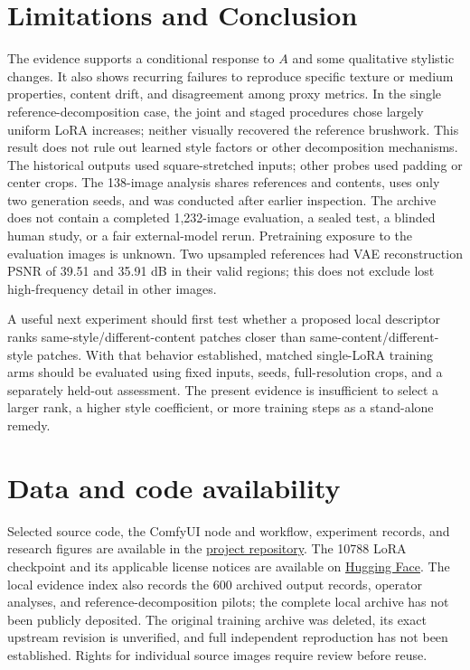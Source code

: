 \documentclass[10pt,letterpaper]{article}
\begin{document}
\section{Limitations and Conclusion}
The evidence supports a conditional response to $A$ and some qualitative stylistic changes. It also shows recurring failures to reproduce specific texture or medium properties, content drift, and disagreement among proxy metrics. In the single reference-decomposition case, the joint and staged procedures chose largely uniform LoRA increases; neither visually recovered the reference brushwork. This result does not rule out learned style factors or other decomposition mechanisms. The historical outputs used square-stretched inputs; other probes used padding or center crops. The 138-image analysis shares references and contents, uses only two generation seeds, and was conducted after earlier inspection. The archive does not contain a completed 1,232-image evaluation, a sealed test, a blinded human study, or a fair external-model rerun. Pretraining exposure to the evaluation images is unknown. Two upsampled references had VAE reconstruction PSNR of 39.51 and 35.91 dB in their valid regions; this does not exclude lost high-frequency detail in other images.

A useful next experiment should first test whether a proposed local descriptor ranks same-style/different-content patches closer than same-content/different-style patches. With that behavior established, matched single-LoRA training arms should be evaluated using fixed inputs, seeds, full-resolution crops, and a separately held-out assessment. The present evidence is insufficient to select a larger rank, a higher style coefficient, or more training steps as a stand-alone remedy.

\section*{Data and code availability}
Selected source code, the ComfyUI node and workflow, experiment records, and research figures are available in the \href{https://github.com/lightlanguage1/anima-single-lora-style-transfer}{project repository}. The 10788 LoRA checkpoint and its applicable license notices are available on \href{https://huggingface.co/lightlanguang/Anima-Single-LoRA-Style-Transfer-10788}{Hugging Face}. The local evidence index also records the 600 archived output records, operator analyses, and reference-decomposition pilots; the complete local archive has not been publicly deposited. The original training archive was deleted, its exact upstream revision is unverified, and full independent reproduction has not been established. Rights for individual source images require review before reuse.
\end{document}
